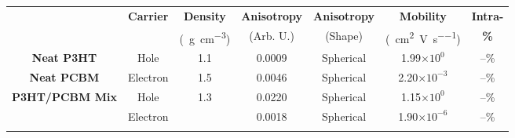 \documentclass[12pt]{article}
\def\mobunits{\square\centi\meter\per\volt\per\second}
\def\gcm{\gram\per\cubic\centi\meter}
\def\ccg{\cellcolor{gray}}
\begin{document}
\begin{center}
\begin{tabular}{| c | c | c | c | c | c | c |}
\hline
\rule{0pt}{2.5ex} 
\multirow{2}{*}{\textbf{Simulation}}&\multirow{2}{*}{\textbf{Carrier}}&\textbf{Density}&\textbf{Anisotropy}&\textbf{Anisotropy}&\textbf{Mobility}&\textbf{Intra-}\\
                            &&(\SI{}{\gcm})&(Arb. U.)&(Shape)&(\SI{}{\mobunits})&\textbf{\%}\\
\hhline{|=======|}
\textbf{Neat P3HT}&\rule{0pt}{2.5ex}Hole&1.1&0.0009&Spherical&1.99$\times 10^{0}$&--\%\\
\ccg\textbf{Neat PCBM}&\ccg \rule{0pt}{2.5ex}Electron&\ccg 1.5&\ccg 0.0046&\ccg Spherical&\ccg 2.20$\times 10^{-3}$&\ccg --\%\\
\multirow{2}{*}{\textbf{P3HT/PCBM Mix}}&\rule{0pt}{2.5ex}Hole&\multirow{2}{*}{1.3}&0.0220&Spherical&1.15$\times 10^{0}$&--\%\\
&\ccg \rule{0pt}{2.5ex}Electron&&\ccg 0.0018&\ccg Spherical&\ccg 1.90$\times 10^{-6}$&\ccg --\%\\
\hhline{-------}
\end{tabular}\label{table:mob}
\end{center}
\end{document}
